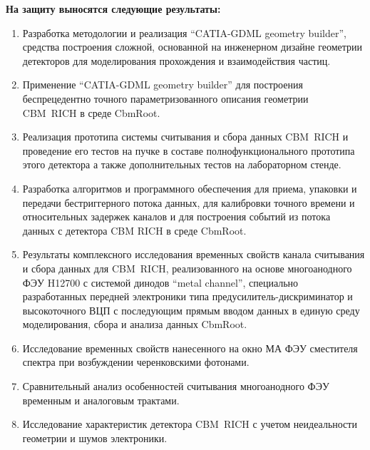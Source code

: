 \textbf{На защиту выносятся следующие результаты:}

\begin{enumerate}
\item Разработка методологии и реализация ``CATIA-GDML geometry builder'', средства построения сложной, основанной на инженерном дизайне геометрии детекторов для моделирования прохождения и взаимодействия частиц.
\item Применение ``CATIA-GDML geometry builder'' для построения беспрецедентно точного параметризованного описания геометрии CBM~RICH в среде CbmRoot.
\item Реализация прототипа системы считывания и сбора данных CBM~RICH и проведение его тестов на пучке в составе полнофункционального прототипа этого детектора а также дополнительных тестов на лабораторном стенде.
\item Разработка алгоритмов и программного обеспечения для приема, упаковки и передачи бестриггерного потока данных, для калибровки точного времени и относительных задержек каналов и для построения событий из потока данных с детектора CBM RICH в среде CbmRoot.
\item Результаты комплексного исследования временных свойств канала считывания и сбора данных для CBM~RICH, реализованного на основе многоанодного ФЭУ H12700 с системой динодов ``metal channel'', специально разработанных передней электроники типа предусилитель-дискриминатор и высокоточного ВЦП с последующим прямым вводом данных в единую среду моделирования, сбора и анализа данных CbmRoot.
\item Исследование временных свойств нанесенного на окно МА ФЭУ сместителя спектра при возбуждении черенковскими фотонами.
\item Сравнительный анализ особенностей считывания многоанодного ФЭУ временным и аналоговым трактами.
\item Исследование характеристик детектора CBM~RICH с учетом неидеальности геометрии и шумов электроники.
\end{enumerate}
